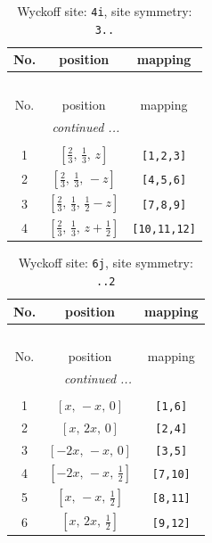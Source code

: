 \documentclass[fleqn,8pt]{jsarticle}
\begin{document}
\renewcommand{\arraystretch}{1.2}
\begin{longtable}{ccc}
\caption{Wyckoff site: {\tt 4i}, site symmetry: {\tt 3..}}
 \\
 \hline \hline
No. & position & mapping \\ \hline \endfirsthead

\multicolumn{2}{l}{\tablename\ \thetable{}} \\
 \hline \hline
No. & position & mapping \\ \hline \endhead

 \hline \hline
\multicolumn{2}{r}{\footnotesize\it continued ...} \\ \endfoot

 \hline \hline
\multicolumn{2}{r}{} \\ \endlastfoot

1 & $\left[ \frac{2}{3},\, \frac{1}{3},\, z \right]$ & {\tt [1,2,3]} \\ \hline
2 & $\left[ \frac{2}{3},\, \frac{1}{3},\, - z \right]$ & {\tt [4,5,6]} \\ \hline
3 & $\left[ \frac{2}{3},\, \frac{1}{3},\, \frac{1}{2} - z \right]$ & {\tt [7,8,9]} \\ \hline
4 & $\left[ \frac{2}{3},\, \frac{1}{3},\, z + \frac{1}{2} \right]$ & {\tt [10,11,12]} \\
\end{longtable}
\renewcommand{\arraystretch}{1.2}
\begin{longtable}{ccc}
\caption{Wyckoff site: {\tt 6j}, site symmetry: {\tt ..2}}
 \\
 \hline \hline
No. & position & mapping \\ \hline \endfirsthead

\multicolumn{2}{l}{\tablename\ \thetable{}} \\
 \hline \hline
No. & position & mapping \\ \hline \endhead

 \hline \hline
\multicolumn{2}{r}{\footnotesize\it continued ...} \\ \endfoot

 \hline \hline
\multicolumn{2}{r}{} \\ \endlastfoot

1 & $\left[ x,\, - x,\, 0 \right]$ & {\tt [1,6]} \\ \hline
2 & $\left[ x,\, 2 x,\, 0 \right]$ & {\tt [2,4]} \\ \hline
3 & $\left[ - 2 x,\, - x,\, 0 \right]$ & {\tt [3,5]} \\ \hline
4 & $\left[ - 2 x,\, - x,\, \frac{1}{2} \right]$ & {\tt [7,10]} \\ \hline
5 & $\left[ x,\, - x,\, \frac{1}{2} \right]$ & {\tt [8,11]} \\ \hline
6 & $\left[ x,\, 2 x,\, \frac{1}{2} \right]$ & {\tt [9,12]} \\
\end{longtable}
\end{document}
